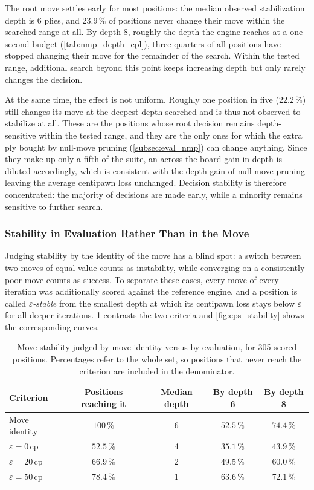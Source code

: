 The root move settles early for most positions: the median observed stabilization
depth is 6 plies, and $23.9\,\%$ of positions never change their move within the
searched range at all. By depth 8, roughly the depth the engine reaches at a
one-second budget (\cref{tab:nmp_depth_cpl}), three quarters of all positions have
stopped changing their move for the remainder of the search. Within the tested
range, additional search beyond this point keeps increasing depth but only rarely
changes the decision.

At the same time, the effect is not uniform. Roughly one position in five
($22.2\,\%$) still changes its move at the deepest depth searched and is thus not
observed to stabilize at all. These are the positions whose root decision remains
depth-sensitive within the tested range, and they are the only ones for which the
extra ply bought by null-move pruning (\cref{subsec:eval_nmp}) can change anything.
Since they make up only a fifth of the suite, an across-the-board gain in depth is
diluted accordingly, which is consistent with the depth gain of null-move pruning
leaving the average centipawn loss unchanged. Decision stability is therefore
concentrated: the majority of decisions are made early, while a minority remains
sensitive to further search.

\subsubsection{Stability in Evaluation Rather Than in the Move}
\label{subsubsec:eval_eps_stability}

Judging stability by the identity of the move has a blind spot: a switch between
two moves of equal value counts as instability, while converging on a
consistently poor move counts as success. To separate these cases, every move of
every iteration was additionally scored against the reference engine, and a
position is called \emph{$\varepsilon$-stable} from the smallest depth at which
its centipawn loss stays below $\varepsilon$ for all deeper iterations.
\cref{tab:eps_stability} contrasts the two criteria and \cref{fig:eps_stability}
shows the corresponding curves.

\begin{table}[ht]
\centering
\begin{tabular}{@{}lcccc@{}}
\toprule
Criterion & Positions reaching it & Median depth & By depth 6 & By depth 8 \\ \midrule
Move identity            & $100\,\%$  & 6 & $52.5\,\%$ & $74.4\,\%$ \\
$\varepsilon = 0$\,cp    & $52.5\,\%$ & 4 & $35.1\,\%$ & $43.9\,\%$ \\
$\varepsilon = 20$\,cp   & $66.9\,\%$ & 2 & $49.5\,\%$ & $60.0\,\%$ \\
$\varepsilon = 50$\,cp   & $78.4\,\%$ & 1 & $63.6\,\%$ & $72.1\,\%$ \\ \bottomrule
\end{tabular}
\caption{Move stability judged by move identity versus by evaluation, for 305
scored positions. Percentages refer to the whole set, so positions that never
reach the criterion are included in the denominator.}
\label{tab:eps_stability}
\end{table}

